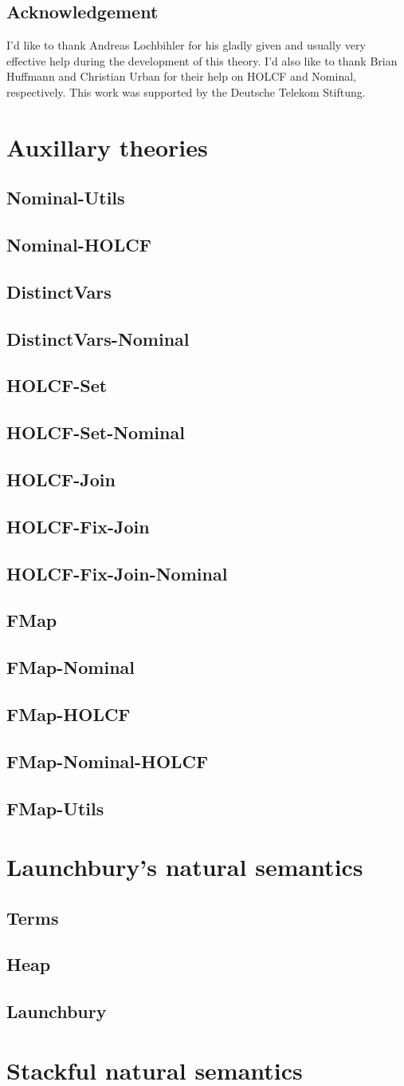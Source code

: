 \documentclass[11pt,a4paper,parskip=half]{scrartcl}
\begin{document}
\subsection{Acknowledgement}

I’d like to thank Andreas Lochbihler for his gladly given and usually very effective help during the development of this theory. I’d also like to thank Brian Huffmann and Christian Urban for their help on HOLCF and Nominal, respectively. This work was supported by the Deutsche Telekom Stiftung.

\clearpage
\newcommand{\theory}[1]{\subsection{#1}\label{sec_#1}}

\section{Auxillary theories}

\label{ch_aux}

\theory{Nominal-Utils}


\theory{Nominal-HOLCF}

\theory{DistinctVars}

\theory{DistinctVars-Nominal}

\theory{HOLCF-Set}

\theory{HOLCF-Set-Nominal}

\theory{HOLCF-Join}

\theory{HOLCF-Fix-Join}

\theory{HOLCF-Fix-Join-Nominal}

\theory{FMap}

\theory{FMap-Nominal}

\theory{FMap-HOLCF}

\theory{FMap-Nominal-HOLCF}

\theory{FMap-Utils}

\clearpage
\section{Launchbury's natural semantics}
\label{ch_natsem}

\theory{Terms}
\theory{Heap}

\theory{Launchbury}

\clearpage
\section{Stackful natural semantics}
\label{ch_natsemstack}
\end{document}
